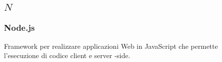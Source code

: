 \subsection*{\quad$N\quad$}
\subsubsection*{Node.js}
Framework per realizzare applicazioni Web in JavaScript che permette l'esecuzione di codice client e server -side.